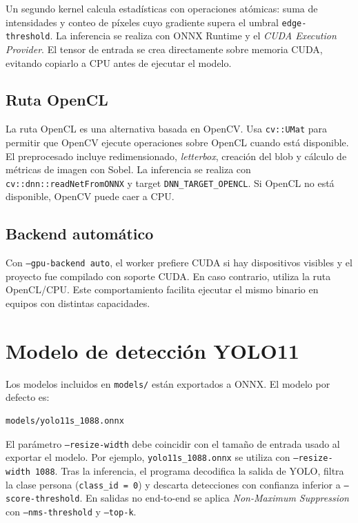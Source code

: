 \documentclass[12pt,a4paper]{article}
\begin{document}
Un segundo kernel calcula estad\'isticas con operaciones at\'omicas: suma de intensidades y
conteo de p\'ixeles cuyo gradiente supera el umbral \texttt{edge-threshold}. La inferencia se
realiza con ONNX Runtime y el \textit{CUDA Execution Provider}. El tensor de entrada se crea
directamente sobre memoria CUDA, evitando copiarlo a CPU antes de ejecutar el modelo.

\subsection{Ruta OpenCL}

La ruta OpenCL es una alternativa basada en OpenCV. Usa \texttt{cv::UMat} para permitir que
OpenCV ejecute operaciones sobre OpenCL cuando est\'a disponible. El preprocesado incluye
redimensionado, \textit{letterbox}, creaci\'on del blob y c\'alculo de m\'etricas de imagen con
Sobel. La inferencia se realiza con \texttt{cv::dnn::readNetFromONNX} y target
\texttt{DNN\_TARGET\_OPENCL}. Si OpenCL no est\'a disponible, OpenCV puede caer a CPU.

\subsection{Backend autom\'atico}

Con \texttt{--gpu-backend auto}, el worker prefiere CUDA si hay dispositivos visibles y el
proyecto fue compilado con soporte CUDA. En caso contrario, utiliza la ruta OpenCL/CPU. Este
comportamiento facilita ejecutar el mismo binario en equipos con distintas capacidades.

\section{Modelo de detecci\'on YOLO11}

Los modelos incluidos en \texttt{models/} est\'an exportados a ONNX. El modelo por defecto es:

\begin{lstlisting}[style=console]
models/yolo11s_1088.onnx
\end{lstlisting}

El par\'ametro \texttt{--resize-width} debe coincidir con el tama\~no de entrada usado al
exportar el modelo. Por ejemplo, \texttt{yolo11s\_1088.onnx} se utiliza con
\texttt{--resize-width 1088}. Tras la inferencia, el programa decodifica la salida de YOLO,
filtra la clase persona (\texttt{class\_id = 0}) y descarta detecciones con confianza inferior
a \texttt{--score-threshold}. En salidas no end-to-end se aplica \textit{Non-Maximum
Suppression} con \texttt{--nms-threshold} y \texttt{--top-k}.
\end{document}

